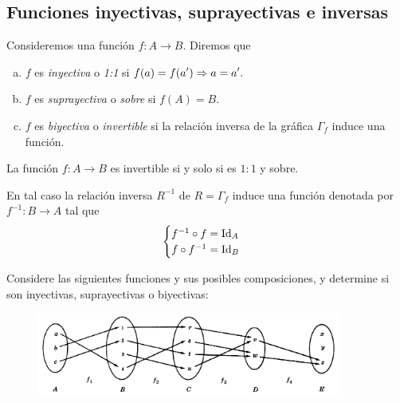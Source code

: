 % 
% 


\subsection{Funciones inyectivas, suprayectivas e inversas}


	\begin{defn} Consideremos una funci\'on $f:A\to B.$ Diremos que
		\begin{enumerate}[(a)]
			\item $f$ es \emph{inyectiva} o \emph{1:1} si $\displaystyle f(a)=f(a')\Rightarrow a=a'.$ 
			
			\item $f$ es \emph{suprayectiva} o \emph{sobre} si
			$\displaystyle f(A)=B.$ 
			
			\item $f$ es \emph{biyectiva} o \emph{invertible} si la relaci\'on inversa de la gr\'afica $\Gamma_{f}$ induce una funci\'on. 
		\end{enumerate}
		
	\end{defn}



	\begin{prop}
		La funci\'on $f:A\to B$ es invertible si y solo si es $1:1$ y sobre.  
		
		En tal caso la relaci\'on inversa $R^{-1}$ de $R=\Gamma_{f}$ induce una funci\'on denotada por $\displaystyle f^{-1}:B\to A$ tal que
		$$
		\begin{cases}
			f^{-1} \circ f = \operatorname{Id}_{A}\\
			f \circ f^{-1} = \operatorname{Id}_{B}
		\end{cases}
		$$
	\end{prop}
	



	\begin{exmp}
		Considere las siguientes funciones y sus posibles composiciones, y determine si son inyectivas, suprayectivas o biyectivas:
		
		\begin{figure}[h!]
			\centering
			\includegraphics[width=10cm,keepaspectratio=true]{./md/MD02_IM01.png}
			\label{fig:MD0201}
		\end{figure}
		
	\end{exmp}
	



